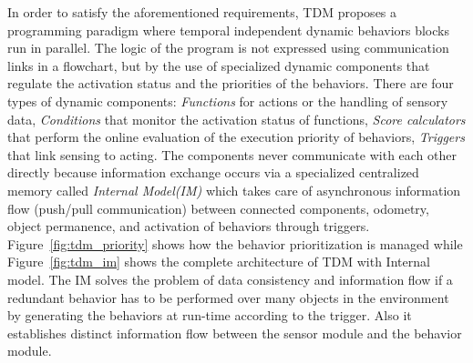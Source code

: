 {%
%
In order to satisfy the aforementioned requirements, TDM proposes a programming paradigm where temporal independent dynamic behaviors blocks run in parallel. The logic of the program is not expressed using communication links in a flowchart, but by the use of specialized dynamic components that regulate the activation status and the priorities of the behaviors. There are four types of dynamic components: \emph{Functions} for actions or the handling of sensory data, \emph{Conditions} that monitor the activation status of functions, \emph{Score calculators} that perform the online evaluation of the execution priority of behaviors, \emph{Triggers} that link sensing to acting. The components never communicate with each other directly because information exchange occurs via a specialized centralized memory called \emph{Internal Model(IM)} which takes care of asynchronous information flow (push/pull communication) between connected components, odometry, object permanence, and activation of behaviors through triggers. Figure~\ref{fig:tdm_priority} shows how the behavior prioritization is managed while Figure~\ref{fig:tdm_im} shows the complete architecture of TDM with Internal model. The IM solves the problem of data consistency and information flow if a redundant behavior has to be performed over many objects in the environment by generating the behaviors at run-time according to the trigger. Also it establishes distinct information flow between the sensor module and the behavior module.
}
